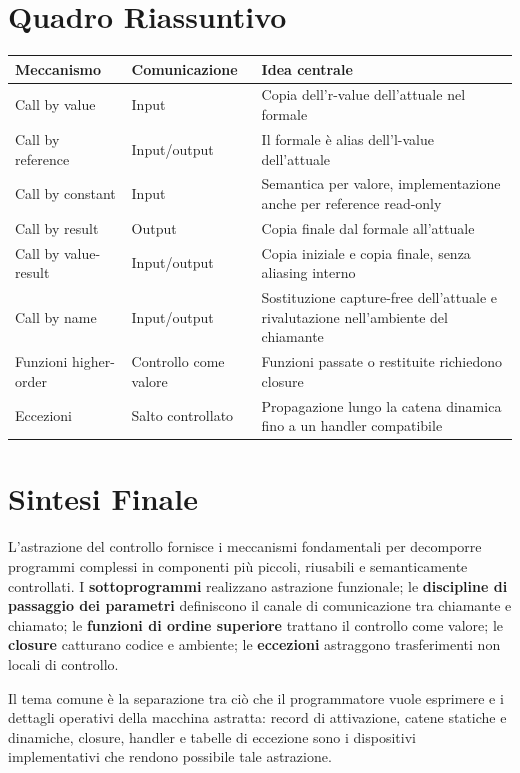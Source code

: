 \documentclass{article}
\begin{document}
\section{Quadro Riassuntivo}

\begin{center}
\begin{tabular}{|p{3.2cm}|p{4.6cm}|p{5.6cm}|}
\hline
\textbf{Meccanismo} & \textbf{Comunicazione} & \textbf{Idea centrale} \\
\hline
Call by value & Input & Copia dell'r-value dell'attuale nel formale \\
\hline
Call by reference & Input/output & Il formale è alias dell'l-value dell'attuale \\
\hline
Call by constant & Input & Semantica per valore, implementazione anche per reference read-only \\
\hline
Call by result & Output & Copia finale dal formale all'attuale \\
\hline
Call by value-result & Input/output & Copia iniziale e copia finale, senza aliasing interno \\
\hline
Call by name & Input/output & Sostituzione capture-free dell'attuale e rivalutazione nell'ambiente del chiamante \\
\hline
Funzioni higher-order & Controllo come valore & Funzioni passate o restituite richiedono closure \\
\hline
Eccezioni & Salto controllato & Propagazione lungo la catena dinamica fino a un handler compatibile \\
\hline
\end{tabular}
\end{center}

\section{Sintesi Finale}

L'astrazione del controllo fornisce i meccanismi fondamentali per decomporre programmi complessi in componenti più piccoli, riusabili e semanticamente controllati. I \textbf{sottoprogrammi} realizzano astrazione funzionale; le \textbf{discipline di passaggio dei parametri} definiscono il canale di comunicazione tra chiamante e chiamato; le \textbf{funzioni di ordine superiore} trattano il controllo come valore; le \textbf{closure} catturano codice e ambiente; le \textbf{eccezioni} astraggono trasferimenti non locali di controllo.

Il tema comune è la separazione tra ciò che il programmatore vuole esprimere e i dettagli operativi della macchina astratta: record di attivazione, catene statiche e dinamiche, closure, handler e tabelle di eccezione sono i dispositivi implementativi che rendono possibile tale astrazione.
\end{document}
